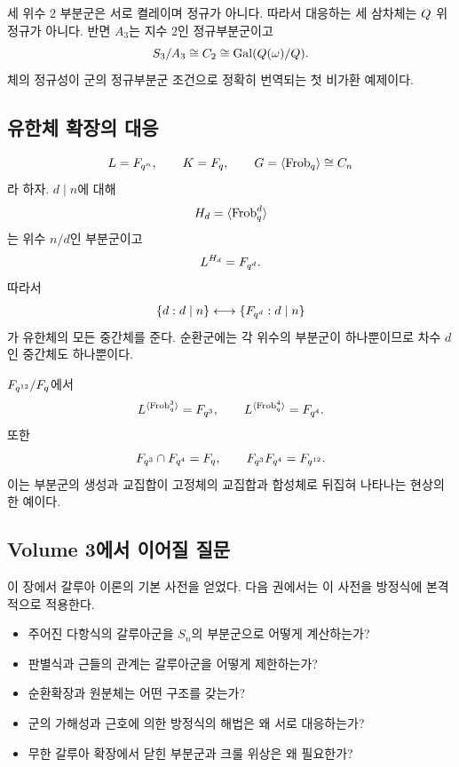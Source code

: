 세 위수 $2$ 부분군은 서로 켤레이며 정규가 아니다. 따라서 대응하는 세 삼차체는 $Q$ 위 정규가 아니다. 반면 $A_3$는 지수 $2$인 정규부분군이고
\[
  S_3/A_3\cong C_2
  \cong\operatorname{Gal}(Q(\omega)/Q).
\]
체의 정규성이 군의 정규부분군 조건으로 정확히 번역되는 첫 비가환 예제이다.

\subsection{유한체 확장의 대응}

\[
  L=F_{q^n},
  \qquad
  K=F_q,
  \qquad
  G=\langle\operatorname{Frob}_q\rangle\cong C_n
\]
라 하자. $d\mid n$에 대해
\[
  H_d=\langle\operatorname{Frob}_q^d\rangle
\]
는 위수 $n/d$인 부분군이고
\[
  L^{H_d}=F_{q^d}.
\]
따라서
\[
  \{d:d\mid n\}
  \longleftrightarrow
  \{F_{q^d}:d\mid n\}
\]
가 유한체의 모든 중간체를 준다. 순환군에는 각 위수의 부분군이 하나뿐이므로 차수 $d$인 중간체도 하나뿐이다.

\begin{example}
$F_{q^{12}}/F_q$에서
\[
  L^{\langle\operatorname{Frob}_q^3\rangle}=F_{q^3},
  \qquad
  L^{\langle\operatorname{Frob}_q^4\rangle}=F_{q^4}.
\]
또한
\[
  F_{q^3}\cap F_{q^4}=F_q,
  \qquad
  F_{q^3}F_{q^4}=F_{q^{12}}.
\]
이는 부분군의 생성과 교집합이 고정체의 교집합과 합성체로 뒤집혀 나타나는 현상의 한 예이다.
\end{example}

\subsection{Volume 3에서 이어질 질문}

이 장에서 갈루아 이론의 기본 사전을 얻었다. 다음 권에서는 이 사전을 방정식에 본격적으로 적용한다.

\begin{itemize}
  \item 주어진 다항식의 갈루아군을 $S_n$의 부분군으로 어떻게 계산하는가?
  \item 판별식과 근들의 관계는 갈루아군을 어떻게 제한하는가?
  \item 순환확장과 원분체는 어떤 구조를 갖는가?
  \item 군의 가해성과 근호에 의한 방정식의 해법은 왜 서로 대응하는가?
  \item 무한 갈루아 확장에서 닫힌 부분군과 크룰 위상은 왜 필요한가?
\end{itemize}

